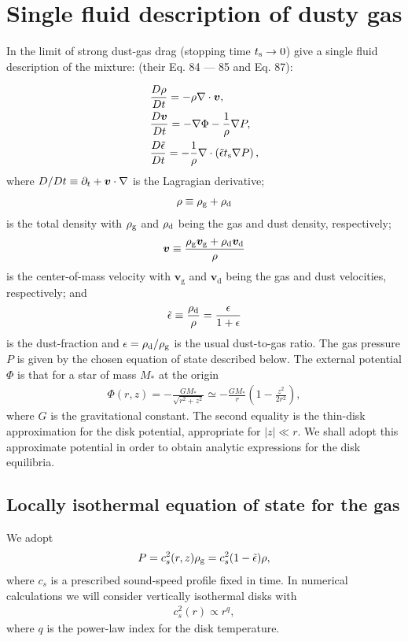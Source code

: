 \section{Single fluid description of dusty gas}\label{setup} 
In the limit of strong dust-gas drag (stopping time $t_\mathrm{s}\to 0$) 
\cite{laibe14} give a single fluid description of the mixture:  
(their Eq. 84 --- 85 and Eq. 87): 

\begin{align}
  &\frac{D\rho}{Dt} = -\rho\nabla\cdot\bm{v}, \label{masseq}\\ 
  &\frac{D\bm{v}}{Dt} = - \nabla\Phi - \frac{1}{\rho}\nabla
  P, \label{momeq}\\ 
  &\frac{D\tilde{\epsilon}}{Dt} = -\frac{1}{\rho} \nabla \cdot \left(\tilde{\epsilon} 
  t_\mathrm{s} \nabla P \right),\label{dusteq}  
\end{align}
where $D/Dt \equiv \partial_t + \bm{v}\cdot\nabla$ is the Lagragian
derivative; 
\begin{align}
  \rho \equiv \rho_\mathrm{g} + \rho_\mathrm{d}
\end{align}
is the total density with $\rho_\mathrm{g}$ and $\rho_\mathrm{d}$ being the gas and dust
density, respectively; 
\begin{align}
  \bm{v} \equiv \frac{\rho_\mathrm{g}\bm{v}_\mathrm{g} + 
    \rho_\mathrm{d}\bm{v}_\mathrm{d}}{\rho}
\end{align}
is the center-of-mass velocity with $\bm{v}_\mathrm{g}$ and
$\bm{v}_\mathrm{d}$ being the gas and dust velocities, respectively; 
and 
\begin{align}
  \tilde{\epsilon} \equiv \frac{\rho_\mathrm{d}}{\rho}  = \frac{\epsilon}{1+\epsilon} 
\end{align}
is the dust-fraction and $\epsilon=\rho_\mathrm{d}/\rho_\mathrm{g}$ is the usual
dust-to-gas ratio. The gas pressure $P$ is given by the chosen 
equation of state described below. The external potential $\Phi$ is
that for a star of mass $M_*$ at the origin 
\begin{align}\label{thin_disk_potential}
  \Phi(r,z) =-\frac{GM_*}{\sqrt{r^2 + z^2}}\simeq
  -\frac{GM_*}{r}\left(1 - \frac{z^2}{2r^2}\right), 
\end{align}
where $G$ is the gravitational constant. The second equality is the 
thin-disk approximation for the disk potential, appropriate for
$|z|\ll r$. We shall adopt this approximate potential in order to
obtain analytic expressions for the disk equilibria.  


\subsection{Locally isothermal equation of state for the gas} 
We adopt 
\begin{align}\label{eos}
  P = c_s^2(r,z)\rho_\mathrm{g} = c_s^{2}(1 - \tilde{\epsilon})\rho,   
\end{align}
where $c_s$ is a prescribed sound-speed profile fixed in time. 
In numerical calculations we will consider vertically 
isothermal disks with \begin{align}\label{power_temp}
  c_s^2(r) \propto r^{q},
\end{align}
where $q$ is the power-law index for the disk temperature. 

